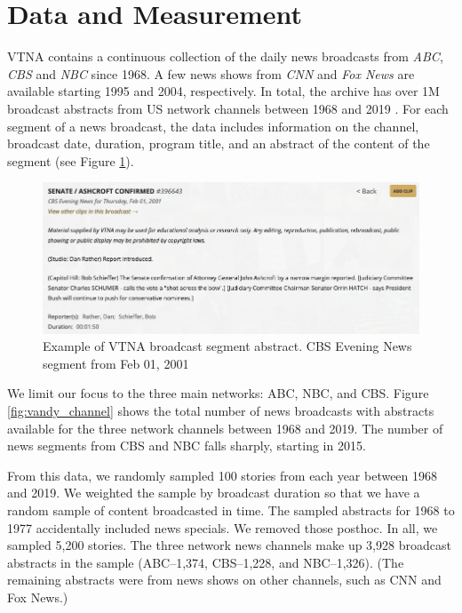 \documentclass[12pt, letterpaper]{article}
\begin{document}
\section*{Data and Measurement}
VTNA contains a continuous collection of the daily news broadcasts from \emph{ABC}, \emph{CBS} and \emph{NBC} since 1968. A few news shows from \emph{CNN} and \emph{Fox News} are available starting 1995 and 2004, respectively. In total, the archive has over 1M broadcast abstracts from US network channels between 1968 and 2019 \citep{lynch1996vanderbilt, soodlaohaprapanon2020}. For each segment of a news broadcast, the data includes information on the channel, broadcast date, duration, program title, and an abstract of the content of the segment (see Figure \ref{fig:vandy_abstract}). 

\begin{figure}[H]
  \centering
  \caption{Example of VTNA broadcast segment abstract. CBS Evening News segment from Feb 01, 2001}
  \label{fig:vandy_abstract}
  \includegraphics[width=.8\linewidth]{../figs/fig_vtna_screenshot_4.png}
\end{figure}

We limit our focus to the three main networks: ABC, NBC, and CBS. Figure \ref{fig:vandy_channel} shows the total number of news broadcasts with abstracts available for the three network channels between 1968 and 2019. The number of news segments from CBS and NBC falls sharply, starting in 2015.

From this data, we randomly sampled 100 stories from each year between 1968 and 2019. We weighted the sample by broadcast duration so that we have a random sample of content broadcasted in time. The sampled abstracts for 1968 to 1977 accidentally included news specials. We removed those posthoc. In all, we sampled 5,200 stories. The three network news channels make up 3,928 broadcast abstracts in the sample (ABC--1,374, CBS--1,228, and NBC--1,326). (The remaining abstracts were from news shows on other channels, such as CNN and Fox News.)
\end{document}
